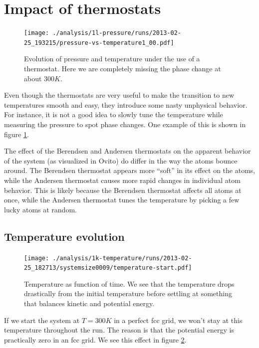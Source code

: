\documentclass[reprint,floatfix,amsmath,amssymb,aps,pra]{revtex4-1}
\begin{document}
\section{Impact of thermostats}

\begin{figure}
  \centering
  \texttt{[image: ./analysis/1l-pressure/runs/2013-02-25\_193215/pressure-vs-temperature1\_00.pdf]}
  \caption{Evolution of pressure and temperature under the use of a thermostat. Here we are completely missing the phase change at about $300 \unit{K}$.}
  \label{fig:pressure-vs-temperature-thermostat}
\end{figure}

Even though the thermostats are very useful to make the transition to new temperatures smooth and easy, they introduce some nasty unphysical behavior. For instance, it is not a good idea to slowly tune the temperature while measuring the pressure to spot phase changes. One example of this is shown in figure \ref{fig:pressure-vs-temperature-thermostat}.

The effect of the Berendsen and Andersen thermostats on the apparent behavior of the system (as visualized in Ovito) do differ in the way the atoms bounce around. The Berendsen thermostat appears more ``soft'' in its effect on the atoms, while the Andersen thermostat causes more rapid changes in individual atom behavior. This is likely because the Berendsen thermostat affects all atoms at once, while the Andersen thermostat tunes the temperature by picking a few lucky atoms at random.

\subsection{Temperature evolution}

\begin{figure}
  \centering
  \texttt{[image: ./analysis/1k-temperature/runs/2013-02-25\_182713/systemsize0009/temperature-start.pdf]}
  \caption{Temperature as function of time. We see that the temperature drops drastically from the initial temperature before settling at something that balances kinetic and potential energy.}
  \label{fig:temperature-evolution}
\end{figure}

If we start the system at $T = 300 \unit{K}$ in a perfect fcc grid, we won't stay at this temperature throughout the run. The reason is that the potential energy is practically zero in an fcc grid. We see this effect in figure \ref{fig:temperature-evolution}.
\end{document}
